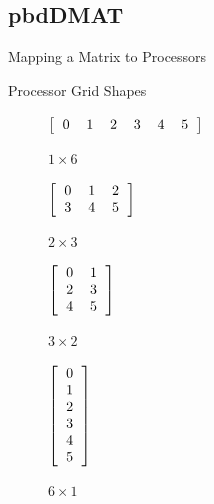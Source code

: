 \subsection{pbdDMAT}
\makesubcontentsslidessec

\begin{frame}{Mapping a Matrix to Processors}
  \begin{block}{Processor Grid Shapes}
    \begin{table}[ht]
      \centering
      \begin{subfigure}[b]{0.23\textwidth}
        \centering
        $\left[\begin{tabular}{llllll}
            0 & 1 & 2 & 3 & 4 & 5
          \end{tabular}\right]$
        \vspace{1.4cm}
        \caption{$1\times 6$}
      \end{subfigure}%
      \begin{subfigure}[b]{0.23\textwidth}
        \centering
        $\left[\begin{tabular}{lll}
            0 & 1 & 2\\
            3 & 4 & 5
          \end{tabular}\right]$
        \caption{$2\times 3$}
      \end{subfigure}%
      \begin{subfigure}[b]{0.23\textwidth}
        \centering
        $\left[\begin{tabular}{ll}
            0 & 1 \\
            2 & 3\\
            4 & 5
          \end{tabular}\right]$
        \caption{$3\times 2$}
      \end{subfigure}
      \begin{subfigure}[b]{0.23\textwidth}
        \centering
        $\left[\begin{tabular}{l}
            0 \\ 1 \\ 2 \\ 3 \\ 4 \\ 5
          \end{tabular}\right]$
        \caption{$6\times 1$}
      \end{subfigure}
      \caption{Processor Grid Shapes with 6 Processors}\label{fig:gridshapes}
    \end{table}
  \end{block}
\end{frame}



